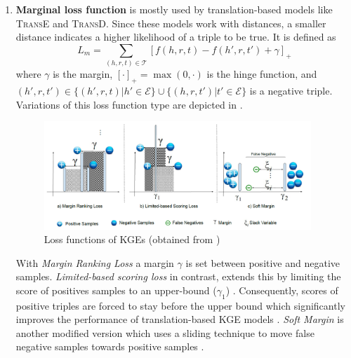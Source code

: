 \begin{enumerate}
    \item 
    \textbf{Marginal loss function} is mostly used by translation-based models like \textsc{TransE} and \textsc{TransD}.
    Since these models work with distances, a smaller distance indicates a higher likelihood of a triple to be true.
    It is defined as 
    \begin{equation}
        L_{m}=\sum_{(h,r,t)\in\mathcal{T}}[f(h,r,t)-f(h',r,t')+\gamma]_+\label{eq:marginalloss}
    \end{equation}
    where $\gamma$ is the margin, $[\cdot]_+=\max(0,\cdot)$ is the hinge function, and $(h',r,t')\in\{(h',r,t)|h'\in\mathcal{E}\}\cup\{(h,r,t')|t'\in\mathcal{E}\}$ is a negative triple.
    Variations of this loss function type are depicted in .
    \begin{figure}[t]
      \centering
        \includegraphics[width=0.95\textwidth]{figures/loss_functions.PNG}
      \caption{Loss functions of \acp{KGE} (obtained from \cite{9207513})}
      \label{fig:loss_functions}
    \end{figure}
    With \textit{Margin Ranking Loss} a margin $\gamma$ is set between positive and negative samples.
    \textit{Limited-based scoring loss} in contrast, extends this by limiting the score of positives samples to an upper-bound ($\gamma_1$) \cite{9207513}.
    Consequently, scores of positive triples are forced to stay before the upper bound which
    significantly improves the performance of translation-based KGE models \cite{9207513}.
    \textit{Soft Margin} is another modified version which uses a sliding technique to move false negative samples towards positive samples \cite{9207513}. 
    

\end{enumerate}
